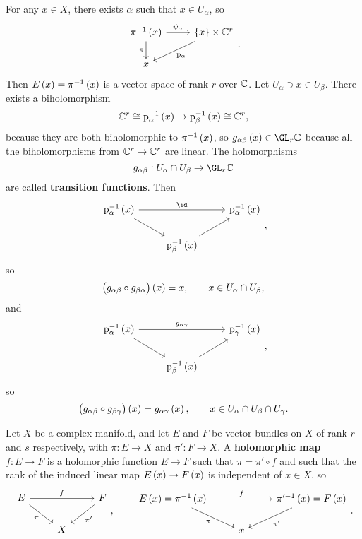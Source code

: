 For any $ x \in X $, there exists $ \alpha $ such that $ x \in U_\alpha $, so
$$
\begin{tikzcd}
\pi^{-1}\br{x} \arrow{r}{\psi_\alpha} \arrow{d}[swap]{\pi} & \cbr{x} \times \CC^r \arrow{dl}{\p_\alpha} \\
x &
\end{tikzcd}.
$$
Then $ E\br{x} = \pi^{-1}\br{x} $ is a vector space of rank $ r $ over $ \mathbb{C} $. Let $ U_\alpha \ni x \in U_\beta $. There exists a biholomorphism
$$ \CC^r \cong \p_\alpha^{-1}\br{x} \to \p_\beta^{-1}\br{x} \cong \CC^r, $$
because they are both biholomorphic to $ \pi^{-1}\br{x} $, so $ g_{\alpha\beta}\br{x} \in \GL_r \CC $ because all the biholomorphisms from $ \mathbb{C}^r \to \mathbb{C}^r $ are linear. The holomorphisms
$$ g_{\alpha\beta} : U_\alpha \cap U_\beta \to \GL_r \CC $$
are called \textbf{transition functions}. Then
$$
\begin{tikzcd}
\p_\alpha^{-1}\br{x} \arrow{rr}{\id} \arrow{dr} & & \p_\alpha^{-1}\br{x} \\
& \p_\beta^{-1}\br{x} \arrow{ur} &
\end{tikzcd},
$$
so
$$ \br{g_{\alpha\beta} \circ g_{\beta\alpha}}\br{x} = x, \qquad x \in U_\alpha \cap U_\beta, $$
and
$$
\begin{tikzcd}
\p_\alpha^{-1}\br{x} \arrow{rr}{g_{\alpha\gamma}} \arrow{dr} & & \p_\gamma^{-1}\br{x} \\
& \p_\beta^{-1}\br{x} \arrow{ur} &
\end{tikzcd},
$$
so
$$ \br{g_{\alpha\beta} \circ g_{\beta\gamma}}\br{x} = g_{\alpha\gamma}\br{x}, \qquad x \in U_\alpha \cap U_\beta \cap U_\gamma. $$

\begin{definition}
Let $ X $ be a complex manifold, and let $ E $ and $ F $ be vector bundles on $ X $ of rank $ r $ and $ s $ respectively, with $ \pi : E \to X $ and $ \pi' : F \to X $. A \textbf{holomorphic map} $ f : E \to F $ is a holomorphic function $ E \to F $ such that $ \pi = \pi' \circ f $ and such that the rank of the induced linear map $ E\br{x} \to F\br{x} $ is independent of $ x \in X $, so
$$
\begin{tikzcd}
E \arrow{rr}{f} \arrow{dr}[swap]{\pi} & & F \arrow{dl}{\pi'} \\
& X &
\end{tikzcd},
\qquad
\begin{tikzcd}
E\br{x} = \pi^{-1}\br{x} \arrow{rr}{f} \arrow{dr}[swap]{\pi} & & \pi'^{-1}\br{x} = F\br{x} \arrow{dl}{\pi'} \\
& x &
\end{tikzcd}.
$$
\end{definition}

